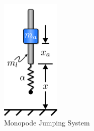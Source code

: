 \begin{figure}[tb!]
    \centering
      \includegraphics[width=0.25\textwidth]{Figures/Ch1/monoped.png}
      \caption{Monopode Jumping System}
      \label{fig:monopode}
\end{figure}
% 

